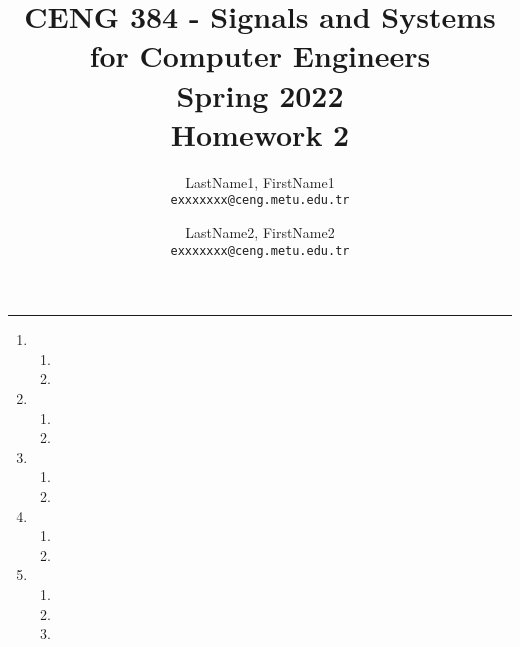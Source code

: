 \documentclass[10pt,a4paper, margin=1in]{article}
\author{
  LastName1, FirstName1\\
  \texttt{exxxxxxx@ceng.metu.edu.tr}
  \and
  LastName2, FirstName2\\
  \texttt{exxxxxxx@ceng.metu.edu.tr}
}
\title{CENG 384 - Signals and Systems for Computer Engineers \\
Spring 2022 \\
Homework 2}
\begin{document}
\maketitle



\noindent\rule{19cm}{1.2pt}

\begin{enumerate}

\item %
    \begin{enumerate}
    \item %
    \item %
    \end{enumerate}

\item %
    \begin{enumerate}
    \item %
    \item %
    \end{enumerate}

\item %
    \begin{enumerate}
    \item %
    \item %
    \end{enumerate}
    
\item %
    \begin{enumerate}
    \item %
    \item %
    \end{enumerate}
    
\item %
    \begin{enumerate}   
    \item %
    \item %
    \item %
    \end{enumerate}

\end{enumerate}
\end{document}
